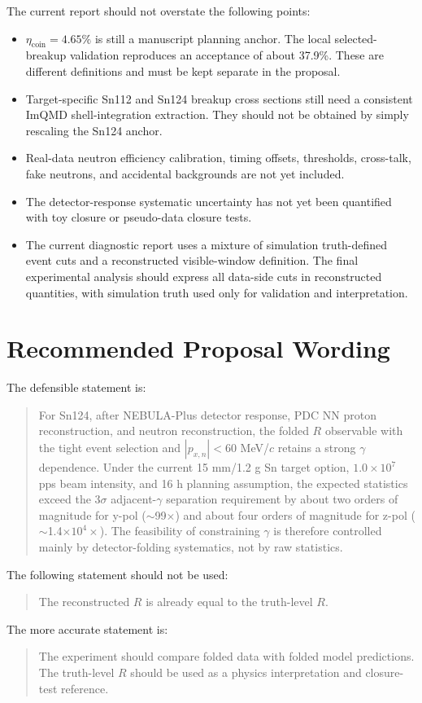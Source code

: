 \documentclass[a4paper,11pt]{article}
\begin{document}
The current report should not overstate the following points:
\begin{itemize}
  \item $\eta_{\mathrm{coin}}=4.65\%$ is still a manuscript planning anchor. The local selected-breakup validation reproduces an acceptance of about 37.9\%. These are different definitions and must be kept separate in the proposal.
  \item Target-specific Sn112 and Sn124 breakup cross sections still need a consistent ImQMD shell-integration extraction. They should not be obtained by simply rescaling the Sn124 anchor.
  \item Real-data neutron efficiency calibration, timing offsets, thresholds, cross-talk, fake neutrons, and accidental backgrounds are not yet included.
  \item The detector-response systematic uncertainty has not yet been quantified with toy closure or pseudo-data closure tests.
  \item The current diagnostic report uses a mixture of simulation truth-defined event cuts and a reconstructed visible-window definition. The final experimental analysis should express all data-side cuts in reconstructed quantities, with simulation truth used only for validation and interpretation.
\end{itemize}

\section{Recommended Proposal Wording}

The defensible statement is:
\begin{quote}
For Sn124, after NEBULA-Plus detector response, PDC NN proton reconstruction, and neutron reconstruction, the folded $R$ observable with the tight event selection and $|p_{x,n}|<60$ MeV/$c$ retains a strong $\gamma$ dependence. Under the current 15 mm/1.2 g Sn target option, $1.0\times10^7$ pps beam intensity, and 16 h planning assumption, the expected statistics exceed the 3$\sigma$ adjacent-$\gamma$ separation requirement by about two orders of magnitude for y-pol ($\sim$99$\times$) and about four orders of magnitude for z-pol ($\sim$1.4$\times10^4\times$). The feasibility of constraining $\gamma$ is therefore controlled mainly by detector-folding systematics, not by raw statistics.
\end{quote}

The following statement should not be used:
\begin{quote}
The reconstructed $R$ is already equal to the truth-level $R$.
\end{quote}

The more accurate statement is:
\begin{quote}
The experiment should compare folded data with folded model predictions. The truth-level $R$ should be used as a physics interpretation and closure-test reference.
\end{quote}
\end{document}
